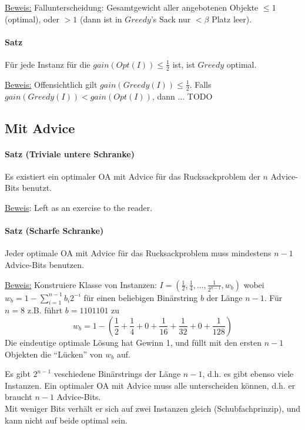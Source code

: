 \underline{Beweis:}
Fallunterscheidung: Gesamtgewicht aller angebotenen Objekte $\leq 1$ (optimal), oder $> 1$ (dann
ist in $Greedy$'s Sack nur $< \beta$ Platz leer).

\paragraph{Satz}
Für jede Instanz für die $gain(Opt(I)) \leq \frac{1}{2}$ ist, ist $Greedy$ optimal.

\underline{Beweis:}
Offensichtlich gilt $gain(Greedy(I)) \leq \frac{1}{2}$.
Falls $gain(Greedy(I)) < gain(Opt(I))$, dann ...
TODO


\subsection{Mit Advice}

\paragraph{Satz (Triviale untere Schranke)}
Es existiert ein optimaler OA mit Advice für das Rucksackproblem der $n$ Advice-Bits benutzt.

\underline{Beweis}: Left as an exercise to the reader.

\paragraph{Satz (Scharfe Schranke)}
Jeder optimale OA mit Advice für das Rucksackproblem muss mindestens $n-1$ Advice-Bits benutzen.

\underline{Beweis:}
Konstruiere Klasse von Instanzen:
$ I = (\frac{1}{2}, \frac{1}{4}, ... , \frac{1}{2^{n-1}}, w_b)$
wobei $ w_b = 1 - \sum_{i=1}^{n-1} b_i 2^{-i} $ für einen beliebigen Binärstring $b$ der Länge $n-1$.
Für $n=8$ z.B. führt $b=1101101$ zu
$$ w_b = 1 - \left( \frac{1}{2} + \frac{1}{4} + 0 + \frac{1}{16} + \frac{1}{32} + 0 + \frac{1}{128} \right) $$
Die eindeutige optimale Lösung hat Gewinn 1, und füllt mit den ersten $n-1$ Objekten die ``Lücken''
von $w_b$ auf.

Es gibt $2^{n-1}$ veschiedene Binärstrings der Länge $n-1$, d.h. es gibt ebenso viele Instanzen.
Ein optimaler OA mit Advice muss alle unterscheiden können, d.h. er braucht $n-1$ Advice-Bits.
\\
Mit weniger Bits verhält er sich auf zwei Instanzen gleich (Schubfachprinzip),
und kann nicht auf beide optimal sein.

